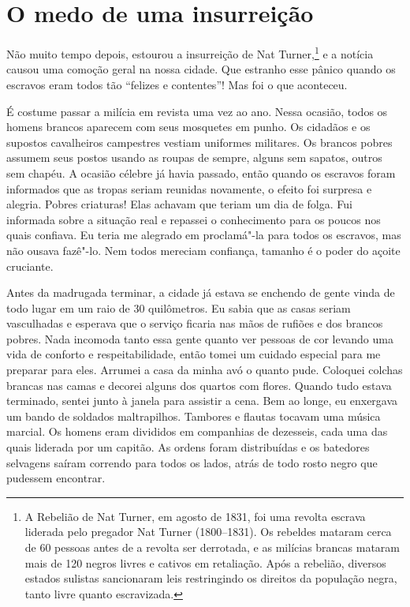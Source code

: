 \chapter*{O medo de uma insurreição}

Não muito tempo depois, estourou a
insurreição de Nat Turner,\footnote{A Rebelião de Nat Turner, em agosto
  de 1831, foi uma revolta escrava liderada pelo pregador
  Nat Turner (1800--1831). Os rebeldes mataram cerca de 60
  pessoas antes de a revolta ser derrotada, e as milícias brancas
  mataram mais de 120 negros livres e cativos em retaliação. Após a
  rebelião, diversos estados sulistas sancionaram leis restringindo os
  direitos da população negra, tanto livre quanto escravizada.} e a
notícia causou uma comoção geral na nossa cidade. Que estranho esse
pânico quando os escravos eram todos tão ``felizes e contentes''! Mas
foi o que aconteceu.

É costume passar a milícia em revista
uma vez ao ano. Nessa ocasião, todos os homens brancos aparecem com seus
mosquetes em punho. Os cidadãos e os supostos cavalheiros campestres
vestiam uniformes militares. Os brancos pobres assumem seus postos
usando as roupas de sempre, alguns sem sapatos, outros sem chapéu. A
ocasião célebre já havia passado, então quando os escravos foram
informados que as tropas seriam reunidas novamente, o efeito foi
surpresa e alegria. Pobres criaturas! Elas achavam que teriam um dia de
folga. Fui informada sobre a situação real e repassei o conhecimento
para os poucos nos quais confiava. Eu teria me alegrado em proclamá"-la
para todos os escravos, mas não ousava fazê"-lo. Nem todos mereciam
confiança, tamanho é o poder do açoite cruciante.

Antes da madrugada terminar, a cidade
já estava se enchendo de gente vinda de todo lugar em um raio de 30
quilômetros. Eu sabia que as casas seriam vasculhadas e esperava que o
serviço ficaria nas mãos de rufiões e dos brancos pobres. Nada incomoda
tanto essa gente quanto ver pessoas de cor levando uma vida de conforto
e respeitabilidade, então tomei um cuidado especial para me preparar
para eles. Arrumei a casa da minha avó o quanto pude. Coloquei colchas
brancas nas camas e decorei alguns dos quartos com flores. Quando tudo
estava terminado, sentei junto à janela para assistir a cena. Bem ao
longe, eu enxergava um bando de soldados maltrapilhos. Tambores e
flautas tocavam uma música marcial. Os homens eram divididos em
companhias de dezesseis, cada uma das quais liderada por um capitão. As
ordens foram distribuídas e os batedores selvagens saíram correndo para
todos os lados, atrás de todo rosto negro que pudessem encontrar.

